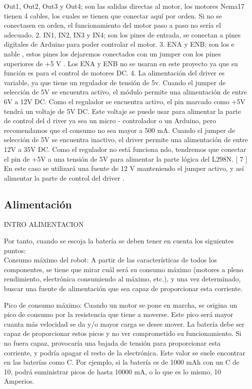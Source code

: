 Out1, Out2, Out3 y Out4; son las salidas directas al motor, los motores Nema17 tienen  4  cables,  los  cuales  se  tienen  que  conectar  aquí  por  orden.  Si  no  se 
conectasen  en  orden,  el funcionamiento  del  motor  paso  a  paso  no  sería  el 
adecuado.
2.
IN1,  IN2,  IN3  y  IN4;  son  los  pines  de  entrada,  se  conectan  a  pines  digitales  de 
Arduino para poder controlar el motor.
3.
ENA y ENB; son los 
e
nable
, estos pines los dejaremos conectados con un 
jumper
con los pines superiores de +5
V
. Los ENA y ENB no se usaran en este proyecto ya 
que su función es para el control de motores DC.
4.
La alimentación del 
driver
es variable, ya que tiene un regulador de tensión de 5v. 
Cuando el 
jumper
de selección de 5V se encuentra
activo, el módulo permite una 
alimentación de entre
6V a 12V DC. Como el regulador se encuentra activo, el pin 
marcado como +5V tendrá un voltaje de 5V DC. Este voltaje se puede usar para 
alimentar la parte de control del 
d
river
ya sea un micro
-
controlador o un Arduino, 
pero recomendamos que el consumo no sea mayor a 500 mA. 
Cuando el jumper de selección de 5V se encuentra
inactivo, el 
driver
permite una 
alimentación  de  entre
12V  a  35V  DC.  Como  el  regulador  no  está  funciona
ndo, 
tendremos que conectar el pin de +5V a una tensión de 5V para alimentar la parte 
lógica del L298N. [
7
]
En  este  caso  se  utilizará  una  fuente  de  12
V
manteniendo  el 
jumper
activo,  y  así 
alimentar la parte de control del 
driver
.



\subsection{Alimentación}
\label{sub:alimentación}

INTRO ALIMENTACION

Por tanto, cuando se escoja la batería se deben tener en cuenta los siguientes puntos:\\

Consumo máximo del robot: A partir de las características de todos los
componentes, se tiene que mirar cuál será su consumo máximo (motores a pleno
rendimiento, electrónica consumiendo al máximo, etc.), y una vez determinado,
buscar una fuente de alimentación que sea capaz de proporcionar esta corriente.

Pico de consumo máximo: Cuando un motor se pone en marcha, se origina un
pico de consumo por la resistencia que tiene a moverse. Este pico será mayor
cuanta más velocidad se da y/o mayor carga se desee mover. La batería debe ser
capaz de proporcionar estos picos y no ver comprometido su funcionamiento. Si no
fuera capaz, provocaría una bajada de tensión para proporcionar esta corriente, y
podría apagar el resto de la electrónica. Este valor se suele encontrar en las
baterías como C. Por ejemplo, si la batería es de 1000 mAh con un C de 10, podrá
suministrar picos de hasta 10000 mA, o lo que es lo mismo, 10 Amperios.

